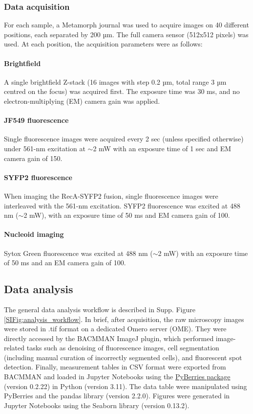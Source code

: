 \subsubsection*{Data acquisition}
For each sample, a Metamorph journal was used to acquire images on 40 different positions, each separated by 200 µm. The full camera sensor (512x512 pixels) was used. At each position, the acquisition parameters were as follows:

\paragraph*{Brightfield} A single brightfield Z-stack (16 images with step 0.2 µm, total range 3 µm centred on the focus) was acquired first. The exposure time was 30 ms, and no electron-multiplying (EM) camera gain was applied.

\paragraph*{JF549 fluorescence} Single fluorescence images were acquired every 2 sec (unless specified otherwise) under 561-nm excitation at $\sim$2 mW with an exposure time of 1 sec and EM camera gain of 150.

\paragraph*{SYFP2 fluorescence} When imaging the RecA-SYFP2 fusion, single fluorescence images were interleaved with the 561-nm excitation. SYFP2 fluorescence was excited at 488 nm ($\sim$2 mW), with an exposure time of 50 ms and EM camera gain of 100.

\paragraph*{Nucleoid imaging} Sytox Green fluorescence was excited at 488 nm ($\sim$2 mW) with an exposure time of 50 ms and an EM camera gain of 100.


\subsection*{Data analysis}
The general data analysis workflow is described in Supp. Figure \ref{SIFig:analysis_workflow}. In brief, after acquisition, the raw microscopy images were stored in .tif format on a dedicated Omero server (OME). They were directly accessed by the BACMMAN ImageJ plugin\cite{Ollion2019}, which performed image-related tasks such as denoising of fluorescence images, cell segmentation (including manual curation of incorrectly segmented cells), and fluorescent spot detection. Finally, measurement tables in CSV format were exported from BACMMAN and loaded in Jupyter Notebooks using the \href{https://gitlab.com/MEKlab/pyberries}{PyBerries package} (version 0.2.22) in Python (version 3.11). The data table were manipulated using PyBerries and the pandas library (version 2.2.0). Figures were generated in Jupyter Notebooks using the Seaborn library (version 0.13.2).

